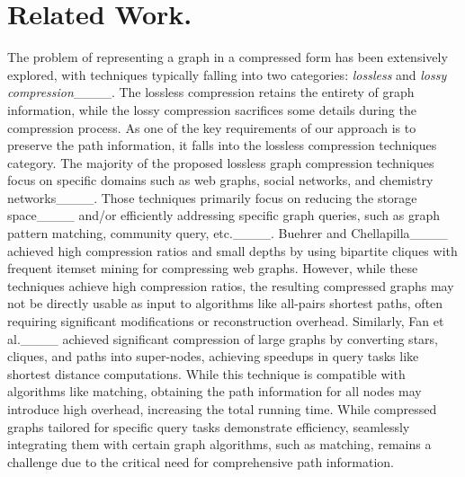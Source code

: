 \section{Related Work.}
\label{sec:related_works}
The problem of representing a graph in a compressed form has been extensively explored,
with techniques typically falling into two categories: \emph{lossless} and \emph{lossy compression}____. The lossless compression retains the entirety of graph information, while the lossy compression sacrifices some details during the compression process. As one of the key requirements of our approach is to preserve the path information, it falls into the lossless compression techniques category. The majority of the proposed lossless graph compression techniques focus on specific domains such as web graphs, social networks, and chemistry networks____. Those techniques primarily focus on reducing the storage space____ and/or efficiently addressing specific graph queries, such as graph pattern matching, community query, etc.____. Buehrer and Chellapilla____ achieved high compression ratios and small depths by using bipartite cliques with frequent itemset mining for compressing web graphs. However, while these techniques achieve high compression ratios, the resulting compressed graphs may not be directly usable as input to algorithms like all-pairs shortest paths, often requiring significant modifications or reconstruction overhead. Similarly, Fan et al.____ achieved significant compression of large graphs by converting stars, cliques, and paths into super-nodes, achieving speedups in query tasks like shortest distance computations. While this technique is compatible with algorithms like matching, obtaining the path information for all nodes may introduce high overhead, increasing the total running time. While compressed graphs tailored for specific query tasks demonstrate efficiency, seamlessly integrating them with certain graph algorithms, such as matching, remains a challenge due to the critical need for comprehensive path information. 



